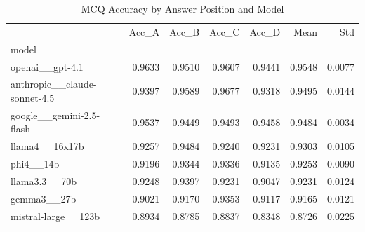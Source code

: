 \begin{table}[htbp]
\centering
\caption{MCQ Accuracy by Answer Position and Model}
\label{tab:position_accuracy}
\begin{tabular}{lrrrrrr}
\toprule
 & Acc_A & Acc_B & Acc_C & Acc_D & Mean & Std \\
model &  &  &  &  &  &  \\
\midrule
openai__gpt-4.1 & 0.9633 & 0.9510 & 0.9607 & 0.9441 & 0.9548 & 0.0077 \\
anthropic__claude-sonnet-4.5 & 0.9397 & 0.9589 & 0.9677 & 0.9318 & 0.9495 & 0.0144 \\
google__gemini-2.5-flash & 0.9537 & 0.9449 & 0.9493 & 0.9458 & 0.9484 & 0.0034 \\
llama4__16x17b & 0.9257 & 0.9484 & 0.9240 & 0.9231 & 0.9303 & 0.0105 \\
phi4__14b & 0.9196 & 0.9344 & 0.9336 & 0.9135 & 0.9253 & 0.0090 \\
llama3.3__70b & 0.9248 & 0.9397 & 0.9231 & 0.9047 & 0.9231 & 0.0124 \\
gemma3__27b & 0.9021 & 0.9170 & 0.9353 & 0.9117 & 0.9165 & 0.0121 \\
mistral-large__123b & 0.8934 & 0.8785 & 0.8837 & 0.8348 & 0.8726 & 0.0225 \\
\bottomrule
\end{tabular}

\end{table}
